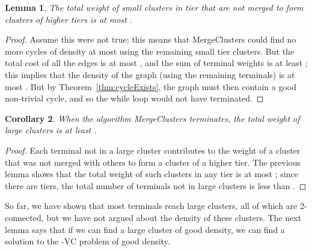 \documentclass[11pt]{article}
\newtheorem{lemma}{Lemma}[section]
\newtheorem{corollary}[lemma]{Corollary}
\newcommand{\kvc}[1]{-{\sc VC} }
\newcommand{\kv}{\kvc{2}}
\begin{document}
\begin{lemma}\label{lem:fewLeftBehind}
  The total weight of small clusters in tier  that are not merged to form
  clusters of higher tiers is at most .
\end{lemma}
\begin{proof}
  Assume this were not true; this means that {\sc MergeClusters} could
  find no more cycles of density at most  using the remaining
  small tier  clusters.  But the total cost of all the edges is at
  most , and the sum of terminal weights is at least
  ; this implies that the density of the
  graph (using the remaining terminals) is at most . But by
  Theorem~\ref{thm:cycleExists}, the graph must then contain a good
  non-trivial cycle, and so the while loop would not have terminated.
\end{proof}

\begin{corollary}\label{cor:weightLargeClusters}
  When the algorithm {\sc MergeClusters} terminates, the total weight of large
  clusters is at least .
\end{corollary}
\begin{proof}
  Each terminal not in a large cluster contributes to the weight of a
  cluster that was not merged with others to form a cluster of a
  higher tier. The previous lemma shows that the total weight of such
  clusters in any tier is at most ;
  since there are  tiers, the total number of terminals
  not in large clusters is less than .
\end{proof}


So far, we have shown that most terminals reach large clusters, all of
which are 2-connected, but we have not argued about the density of
these clusters. The next lemma says that if we can find a large
cluster of good density, we can find a solution to the \kv problem of
good density.
\end{document}
